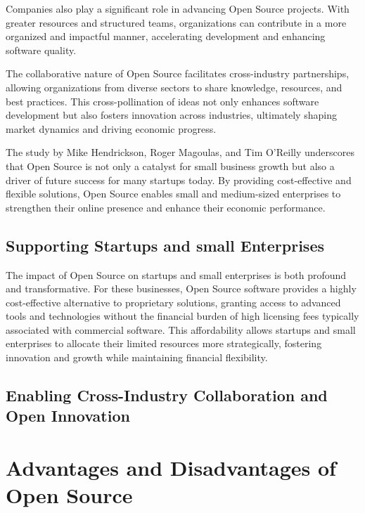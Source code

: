 Companies also play a significant role in advancing Open Source projects. 
With greater resources and structured teams, organizations can contribute in a more organized and impactful manner, 
accelerating development and enhancing software quality.

The collaborative nature of Open Source facilitates cross-industry partnerships, 
allowing organizations from diverse sectors to share knowledge, resources, and best practices. 
This cross-pollination of ideas not only enhances software development but also fosters innovation across industries, 
ultimately shaping market dynamics and driving economic progress.

The study \cite{opensource_hendrickson2012economic} by Mike Hendrickson, Roger Magoulas, 
and Tim O'Reilly underscores that Open Source is not only a catalyst for small business growth but also a driver of future success for many startups today. 
By providing cost-effective and flexible solutions,
Open Source enables small and medium-sized enterprises to strengthen their online presence and enhance their economic performance.


\subsection{Supporting Startups and small Enterprises}

The impact of Open Source on startups and small enterprises is both profound and transformative. 
For these businesses, Open Source software provides a highly cost-effective alternative to proprietary solutions, 
granting access to advanced tools and technologies without the financial burden of high licensing fees typically associated with commercial software. 
This affordability allows startups and small enterprises to allocate their limited resources more strategically,
fostering innovation and growth while maintaining financial flexibility.

\cite{studiolabs_open_source_startups_2024}

\subsection{Enabling Cross-Industry Collaboration and Open Innovation}


\section{Advantages and Disadvantages of Open Source}

